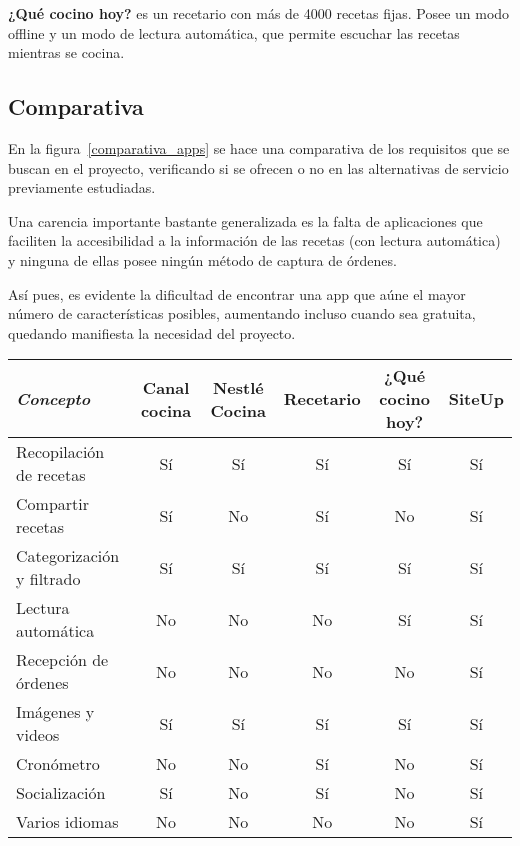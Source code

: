 \textbf{¿Qué cocino hoy?} es un recetario con más de 4000 recetas fijas. Posee
un modo offline y un modo de lectura automática, que permite escuchar las recetas
mientras se cocina.

\subsection{Comparativa}

En la figura~\ref{comparativa_apps} se hace una comparativa de los requisitos
que se buscan en el proyecto, verificando si se ofrecen o no en las alternativas
de servicio previamente estudiadas.

Una carencia importante bastante generalizada es la falta de aplicaciones que
faciliten la accesibilidad a la información de las recetas (con lectura
automática) y ninguna de ellas posee ningún método de captura de órdenes.

Así pues, es evidente la dificultad de encontrar una app que aúne el mayor
número de características posibles, aumentando incluso cuando sea gratuita,
quedando manifiesta la necesidad del proyecto.


\begin{sidewaystable}
  \centering
  \begin{tabular}{|l|c|c|c|c|c|}
    \hline
    \textit{Concepto} & Canal cocina & Nestlé Cocina & Recetario & ¿Qué cocino hoy? & SiteUp\\
    \hline
    Recopilación de recetas & Sí & Sí & Sí & Sí & Sí \\
    \hline
    Compartir recetas & Sí & No & Sí & No & Sí \\
    \hline
    Categorización y filtrado & Sí & Sí & Sí & Sí & Sí \\
    \hline
    Lectura automática & No & No & No & Sí & Sí \\
    \hline
    Recepción de órdenes & No & No & No & No & Sí \\
    \hline
    Imágenes y videos & Sí & Sí & Sí & Sí & Sí \\
    \hline
    Cronómetro & No & No & Sí & No & Sí \\
    \hline
    Socialización & Sí & No & Sí & No & Sí \\
    \hline
    Varios idiomas & No & No & No & No & Sí \\
    \hline
  \end{tabular}
  \caption{Tabla comparativa de apps de cocina}
  \label{comparativa_apps}
\end{sidewaystable}


